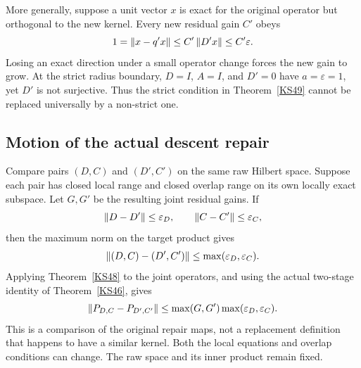 More generally, suppose a unit vector \(x\) is exact for the original operator but orthogonal to the new kernel. Every new residual gain \(C'\) obeys
\[
 1=\left\lVert x-q'x\right\rVert\le C'\left\lVert D'x\right\rVert\le C'\varepsilon.
\]
Losing an exact direction under a small operator change forces the new gain to grow. At the strict radius boundary, \(D=I\), \(A=I\), and \(D'=0\) have \(a=\varepsilon=1\), yet \(D'\) is not surjective. Thus the strict condition in Theorem~\ref{KS49} cannot be replaced universally by a non-strict one.

\subsection{Motion of the actual descent repair}
Compare pairs \((D,C)\) and \((D',C')\) on the same raw Hilbert space. Suppose each pair has closed local range and closed overlap range on its own locally exact subspace. Let \(G,G'\) be the resulting joint residual gains. If
\[
 \left\lVert D-D'\right\rVert\le\varepsilon_D,\qquad
 \left\lVert C-C'\right\rVert\le\varepsilon_C,
\]
then the maximum norm on the target product gives
\[
 \left\lVert(D,C)-(D',C')\right\rVert\le\max(\varepsilon_D,\varepsilon_C).
\]
Applying Theorem~\ref{KS48} to the joint operators, and using the actual two-stage identity of Theorem~\ref{KS46}, gives
\begin{equation}\label{eq:descentmotion}
 \left\lVert P_{D,C}-P_{D',C'}\right\rVert
 \le\max(G,G')\max(\varepsilon_D,\varepsilon_C).
\end{equation}
This is a comparison of the original repair maps, not a replacement definition that happens to have a similar kernel. Both the local equations and overlap conditions can change. The raw space and its inner product remain fixed.
